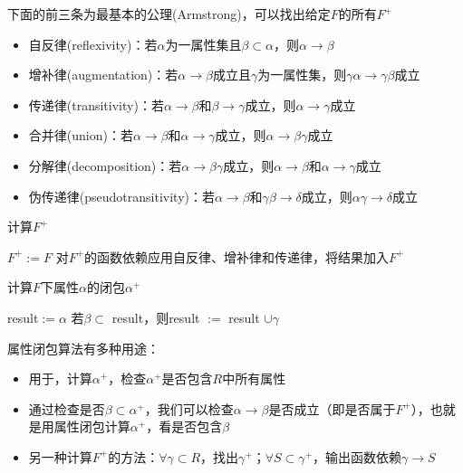 \begin{theorem}[逻辑蕴含公理]
下面的前三条为最基本的公理(Armstrong)，可以找出给定$F$的所有$F^+$
\begin{itemize}
	\item 自反律(reflexivity)：若$\alpha$为一属性集且$\beta\subset\alpha$，则$\alpha\to\beta$
	\item 增补律(augmentation)：若$\alpha\to\beta$成立且$\gamma$为一属性集，则$\gamma\alpha\to\gamma\beta$成立
	\item 传递律(transitivity)：若$\alpha\to\beta$和$\beta\to\gamma$成立，则$\alpha\to\gamma$成立
	\item 合并律(union)：若$\alpha\to\beta$和$\alpha\to\gamma$成立，则$\alpha\to\beta\gamma$成立
	\item 分解律(decomposition)：若$\alpha\to\beta\gamma$成立，则$\alpha\to\beta$和$\alpha\to\gamma$成立
	\item 伪传递律(pseudotransitivity)：若$\alpha\to\beta$和$\gamma\beta\to\delta$成立，则$\alpha\gamma\to\delta$成立
\end{itemize}
\end{theorem}

\begin{algorithm}
\caption{计算$F^+$}
\begin{algorithmic}[1]
\State $F^+:=F$
\Repeat
\State 对$F^+$的函数依赖应用自反律、增补律和传递律，将结果加入$F^+$
\end{algorithmic}
\end{algorithm}

\begin{algorithm}[H]
\caption{计算$F$下属性$\alpha$的闭包$\alpha^+$}
\begin{algorithmic}[1]
\State result$:=\alpha$
\Repeat
{}
\State 若$\beta\subset$ result，则result $:=$ result $\cup\gamma$
\EndFor
{}
\end{algorithmic}
\end{algorithm}

属性闭包算法有多种用途：
\begin{itemize}
	\item 用于，计算$\alpha^+$，检查$\alpha^+$是否包含$R$中所有属性
	\item 通过检查是否$\beta\subset\alpha^+$，我们可以检查$\alpha\to\beta$是否成立（即是否属于$F^+$），也就是用属性闭包计算$\alpha^+$，看是否包含$\beta$
	\item 另一种计算$F^+$的方法：$\forall\gamma\subset R$，找出$\gamma^+$；$\forall S\subset\gamma^+$，输出函数依赖$\gamma\to S$
\end{itemize}


